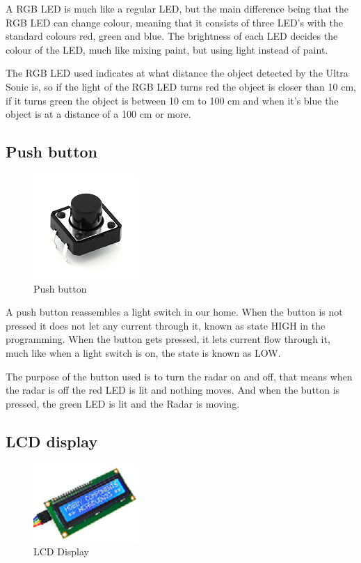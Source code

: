 A RGB LED is much like a regular LED, but the main difference being that the RGB LED can change colour, meaning that it consists of three LED's with the standard colours red, green and blue. The brightness of each LED decides the colour of the LED, much like mixing paint, but using light instead of paint. 

The RGB LED used indicates at what distance the object detected by the Ultra Sonic is, so if the light of the RGB LED turns red the object is closer than 10 cm, if it turns green the object is between 10 cm to 100 cm and when it's blue the object is at a distance of a 100 cm or more.  

\subsection{Push button}

\begin{figure} [h!]
\centering
  \includegraphics{fig/Pushbutton}
  \caption{Push button}
  \label{fig:Pushbutton}
\end{figure}

A push button reassembles a light switch in our home. When the button is not pressed it does not let any current through it, known as state HIGH in the programming. When the button gets pressed, it lets current flow through it, much like when a light switch is on, the state is known as LOW. 

The purpose of the button used is to turn the radar on and off, that means when the radar is off the red LED is lit and nothing moves. And when the button is pressed, the green LED is lit and the Radar is moving.

\subsection{LCD display}

\begin{figure} [h!]
\centering
  \includegraphics{fig/LCDdisplay}
  \caption{LCD Display}
  \label{fig:LCDdisplay}
\end{figure}  

